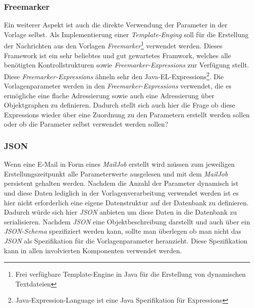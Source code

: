 \subsubsection{Freemarker}
\label{sec:template-parameter-freemarker}
Ein weiterer Aspekt ist auch die direkte Verwendung der Parameter in der Vorlage selbst. Als Implementierung einer \emph{Template-Enging} soll für die Erstellung der Nachrichten aus den Vorlagen \emph{Freemarker}\footnote{\label{fn:freemarker}Frei verfügbare Template-Engine in Java für die Erstellung von dynamischen Textdateien} verwendet werden. Dieses Framework ist ein sehr beliebtes und gut gewartetes Framwork, welches alle benötigten Kontrollstrukturen sowie \emph{Freemarker-Expressions} zur Verfügung stellt. Diese \emph{Freemarker-Expressions} ähneln sehr den Java-EL-Expressions\footnote{Java-Expression-Language ist eine Java Spezifikation für Expressions}. 
Die Vorlagenparameter werden in den \emph{Freemarker-Expressions} verwendet, die es ermögliche eine flache Adressierung sowie auch eine Adressierung über Objektgraphen zu definieren. Dadurch stellt sich auch hier die Frage ob diese Expressions wieder über eine Zuordnung zu den Parametern erstellt werden sollen oder ob die Parameter selbst verwendet werden sollen?

\subsubsection{JSON}
\label{sec:template-parameter-json}
Wenn eine E-Mail in Form eines \emph{MailJob} erstellt wird müssen zum jeweiligen Erstellungszeitpunkt alle Parameterwerte ausgelesen und mit dem \emph{MailJob} persistent gehalten werden. Nachdem die Anzahl der Parameter dynamisch ist und diese Daten lediglich in der Vorlagenverarbeitung verwendet werden ist es hier nicht erforderlich eine eigene Datenstruktur auf der Datenbank zu definieren. Dadurch würde sich hier \emph{JSON} anbieten um diese Daten in die Datenbank zu serialisieren. Nachdem \emph{JSON} eine Objektbeschreibung darstellt und auch über ein \emph{JSON-Schema} spezifiziert werden kann, sollte man überlegen ob man nicht das \emph{JSON} als Spezifikation für die Vorlagenparameter heranzieht. Diese Spezifikation kann in allen involvierten Komponenten verwendet werden. 

\newpage

